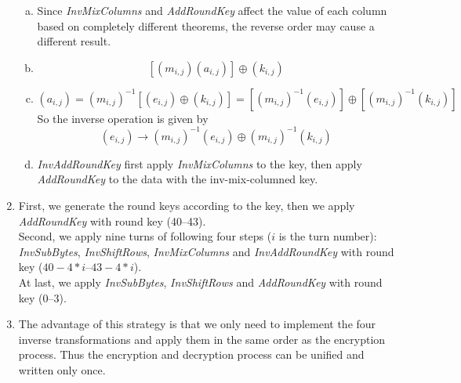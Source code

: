 \documentclass{article}
\begin{document}
\begin{enumerate}
\begin{enumerate}[(a)]
\item
Since \emph{InvMixColumns} and \emph{AddRoundKey} affect the value of each column based on completely different theorems, the reverse order may cause a different result.
\item
$$[(m_{i,j})(a_{i,j})]\oplus(k_{i,j})$$
\item
$$(a_{i,j})=(m_{i,j})^{-1}[(e_{i,j})\oplus(k_{i,j})]=[(m_{i,j})^{-1}(e_{i,j})]\oplus[(m_{i,j})^{-1}(k_{i,j})]$$
So the inverse operation is given by
$$(e_{i,j})\longrightarrow(m_{i,j})^{-1}(e_{i,j})\oplus(m_{i,j})^{-1}(k_{i,j})$$
\item
\emph{InvAddRoundKey} first apply \emph{InvMixColumns} to the key, then apply \emph{AddRoundKey} to the data with the inv-mix-columned key.
\end{enumerate}
\item
First, we generate the round keys according to the key, then we apply \emph{AddRoundKey} with round key (40--43).\\[1mm]
Second, we apply nine turns of following four steps ($i$ is the turn number): \emph{InvSubBytes}, \emph{InvShiftRows}, \emph{InvMixColumns} and \emph{InvAddRoundKey} with round key ($40-4*i$--$43-4*i$).\\[1mm]
At last, we apply \emph{InvSubBytes}, \emph{InvShiftRows} and \emph{AddRoundKey} with round key (0--3).
\item The advantage of this strategy is that we only need to implement the four inverse transformations and apply them in the same order as the encryption process. Thus the encryption and decryption process can be unified and written only once.
\end{enumerate}
\end{document}
